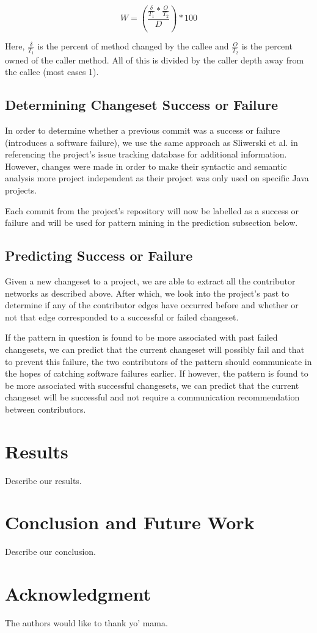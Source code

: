\documentclass[conference]{IEEEtran}
\begin{document}
\begin{equation}\label{first}
W = (\frac{\frac{\delta}{T_{1}}*\frac{O}{T_{2}}}{D})*100
\end{equation}

Here, $\frac{\delta}{T_{1}}$ is the percent of method changed by the callee and $\frac{O}{T_{2}}$ is the percent
owned of the caller method. All of this is divided by the caller depth away from the callee (most cases
1). 

\subsection{Determining Changeset Success or Failure}
In order to determine whether a previous commit was a success or failure (introduces a software
failure), we use the same approach as Sliwerski et al. \cite{Sliwerski:2005:CIF} in referencing the project's issue tracking
database for additional information. However, changes were made in order to make their syntactic 
and semantic analysis more project independent as their project was only used on specific Java projects. 

Each commit from the project's repository will now be labelled as a success
or failure and will be used for pattern mining in the prediction subsection below.

\subsection{Predicting Success or Failure}
Given a new changeset to a project, we are able to extract all the contributor networks as described
above. After which, we look into the project's past to determine if any of the contributor edges have
occurred before and whether or not that edge corresponded to a successful or failed changeset.

If the pattern in question is found to be more associated with past failed changesets, we can predict that
the current changeset will possibly fail and that to prevent this failure, the two contributors of the 
pattern should communicate in the hopes of catching software failures earlier. If however, the pattern
is found to be more associated with successful changesets, we can predict that the current changeset
will be successful and not require a communication recommendation between contributors.


\section{Results}
Describe our results.


\section{Conclusion and Future Work}
Describe our conclusion.


\section*{Acknowledgment}
The authors would like to thank yo' mama.






\end{document}

